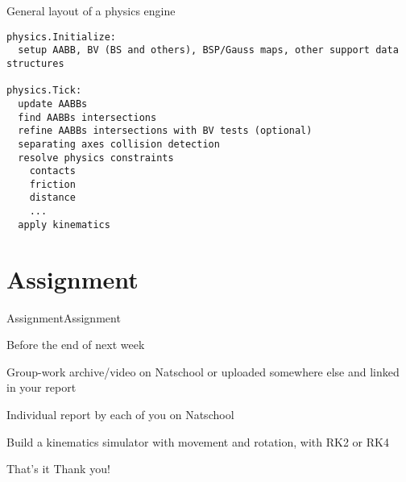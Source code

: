 \documentclass{beamer}
\begin{document}
\begin{frame}[fragile]{General layout of a physics engine}
\begin{lstlisting}
physics.Initialize:
  setup AABB, BV (BS and others), BSP/Gauss maps, other support data structures
  
physics.Tick:
  update AABBs
  find AABBs intersections
  refine AABBs intersections with BV tests (optional)
  separating axes collision detection
  resolve physics constraints
    contacts
    friction
    distance
    ...
  apply kinematics
\end{lstlisting}
\end{frame}

\section{Assignment}
\begin{slide}{Assignment}{Assignment}{
\item Before the end of next week
\item Group-work archive/video on Natschool or uploaded somewhere else and linked in your report
\item Individual report by each of you on Natschool
\item Build a kinematics simulator with movement and rotation, with RK2 or RK4
}\end{slide}

\begin{frame}{That's it}
\center
\fontsize{18pt}{7.2}\selectfont
Thank you!
\end{frame}
\end{document}
